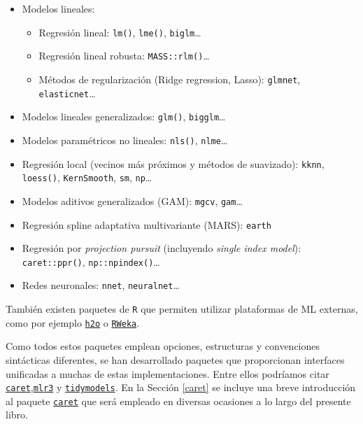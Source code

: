 \documentclass[
  spanish,
]{book}
\theoremstyle{break}
\theoremstyle{definition}
\theoremstyle{definition}
\theoremstyle{definition}
\theoremstyle{definition}
\theoremstyle{remark}
\begin{document}
\begin{itemize}
\item
  Modelos lineales:

  \begin{itemize}
  \item
    Regresión lineal: \texttt{lm()}, \texttt{lme()}, \texttt{biglm}\ldots{}
  \item
    Regresión lineal robusta: \texttt{MASS::rlm()}\ldots{}
  \item
    Métodos de regularización (Ridge regression, Lasso):
    \texttt{glmnet}, \texttt{elasticnet}\ldots{}
  \end{itemize}
\item
  Modelos lineales generalizados: \texttt{glm()}, \texttt{bigglm}\ldots{}
\item
  Modelos paramétricos no lineales: \texttt{nls()}, \texttt{nlme}\ldots{}
\item
  Regresión local (vecinos más próximos y métodos de suavizado):
  \texttt{kknn}, \texttt{loess()}, \texttt{KernSmooth}, \texttt{sm}, \texttt{np}\ldots{}
\item
  Modelos aditivos generalizados (GAM): \texttt{mgcv}, \texttt{gam}\ldots{}
\item
  Regresión spline adaptativa multivariante (MARS): \texttt{earth}
\item
  Regresión por \emph{projection pursuit} (incluyendo \emph{single index model}): \texttt{caret::ppr()}, \texttt{np::npindex()}\ldots{}
\item
  Redes neuronales: \texttt{nnet}, \texttt{neuralnet}\ldots{}
\end{itemize}

También existen paquetes de \texttt{R} que permiten utilizar plataformas de ML externas, como por ejemplo \href{https://github.com/h2oai/h2o-3/tree/master/h2o-r}{\texttt{h2o}} o \href{https://CRAN.R-project.org/package=RWeka}{\texttt{RWeka}}.

Como todos estos paquetes emplean opciones, estructuras y convenciones sintácticas diferentes, se han desarrollado paquetes que proporcionan interfaces unificadas a muchas de estas implementaciones.
Entre ellos podríamos citar \href{https://topepo.github.io/caret}{\texttt{caret}},\href{https://mlr3.mlr-org.com}{\texttt{mlr3}} y \href{https://www.tidymodels.org}{\texttt{tidymodels}}.
En la Sección \ref{caret} se incluye una breve introducción al paquete \href{https://topepo.github.io/caret}{\texttt{caret}} que será empleado en diversas ocasiones a lo largo del presente libro.
\end{document}
